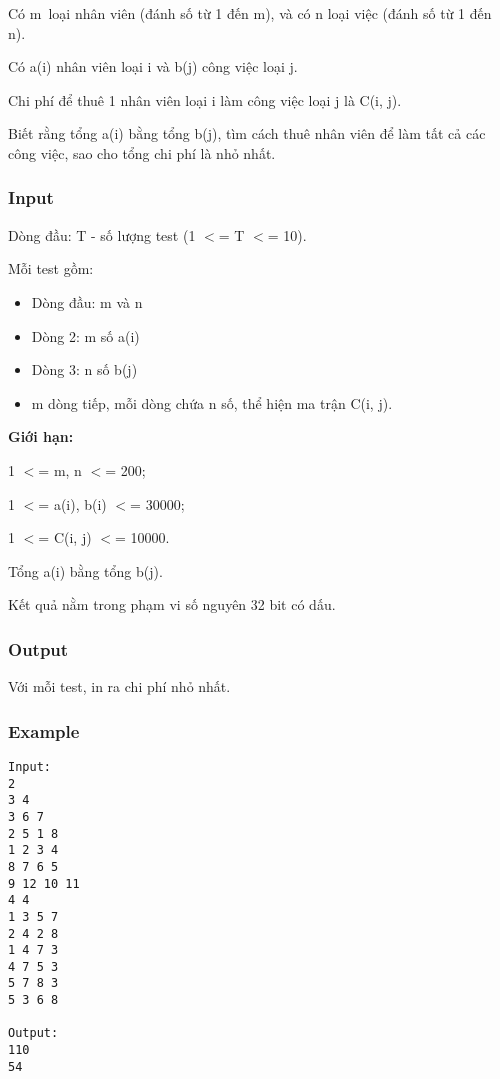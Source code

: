 

Có m loại nhân viên (đánh số từ 1 đến m), và có n loại việc (đánh số từ 1 đến n).

Có a(i) nhân viên loại i và b(j) công việc loại j.

Chi phí để thuê 1 nhân viên loại i làm công việc loại j là C(i, j).

Biết rằng tổng a(i) bằng tổng b(j), tìm cách thuê nhân viên để làm tất cả các công việc, sao cho tổng chi phí là nhỏ nhất.

\subsubsection{Input}

Dòng đầu: T - số lượng test (1 $<$= T $<$= 10).

Mỗi test gồm:
\begin{itemize}
	\item Dòng đầu: m và n
	\item Dòng 2: m số a(i)
	\item Dòng 3: n số b(j)
	\item m dòng tiếp, mỗi dòng chứa n số, thể hiện ma trận C(i, j).
\end{itemize}

\textbf{Giới hạn:}

1 $<$= m, n $<$= 200;

1 $<$= a(i), b(i) $<$= 30000;

1 $<$= C(i, j) $<$= 10000.

Tổng a(i) bằng tổng b(j).

Kết quả nằm trong phạm vi số nguyên 32 bit có dấu.

\subsubsection{Output}

Với mỗi test, in ra chi phí nhỏ nhất.

\subsubsection{Example}
\begin{verbatim}
Input:
2
3 4
3 6 7
2 5 1 8
1 2 3 4
8 7 6 5
9 12 10 11
4 4
1 3 5 7
2 4 2 8
1 4 7 3
4 7 5 3
5 7 8 3
5 3 6 8

Output:
110
54
\end{verbatim}